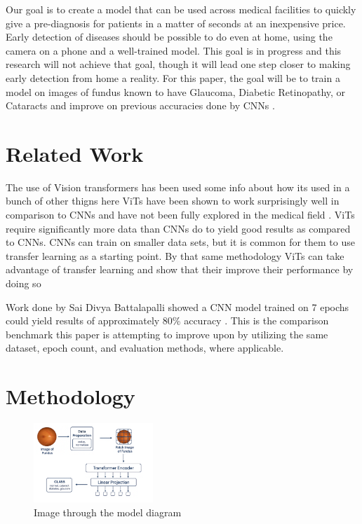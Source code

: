 \documentclass[sigconf]{acmart}
\begin{document}
Our goal is to create a model that can be used across medical facilities to quickly give a pre-diagnosis for patients in a matter of seconds at an inexpensive price. Early detection of diseases should be possible to do even at home, using the camera on a phone and a well-trained model. This goal is in progress and this research will not achieve that goal, though it will lead one step closer to making early detection from home a reality. For this paper, the goal will be to train a model on images of fundus known to have Glaucoma, Diabetic Retinopathy, or Cataracts and improve on previous accuracies done by CNNs \cite{Github} \cite{Cherlaramani}.

\section{Related Work}
The use of Vision transformers has been used some info about how its used in a bunch of other thigns here ViTs have been shown to work surprisingly well in comparison to CNNs \cite{Dosovitskiy} and have not been fully explored in the medical field \cite{Matsoukas}. ViTs require significantly more data than CNNs do to yield good results as compared to CNNs. CNNs can train on smaller data sets, but it is common for them to use transfer learning as a starting point. By that same methodology ViTs can take advantage of transfer learning and show that their improve their performance by doing so \cite{Matsoukas} 

Work done by Sai Divya Battalapalli showed a CNN model trained on 7 epochs could yield results of approximately 80\% accuracy \cite{Github}. This is the comparison benchmark this paper is attempting to improve upon by utilizing the same dataset, epoch count, and evaluation methods, where applicable.

\section{Methodology}

\begin{figure}[h]
  \centering
  \includegraphics[width=0.4\textwidth]{samples/resources/diagram.png}
  \caption{Image through the model diagram}
\end{figure}
\end{document}
